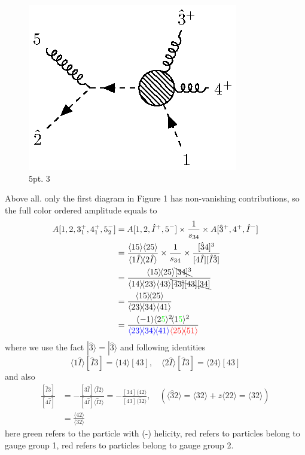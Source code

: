 \documentclass[12pt]{article}
\newcommand{\mdavg}[2]{\langle #1 \rangle\!\langle #2 \rangle}
\newcommand{\avg}[1]{\langle #1 \rangle}
\newcommand{\doubleavg}[2]{\left\langle #1 \right\rangle\!\left\langle #2 \right\rangle}
\newcommand{\inavg}[2]{\langle #1 \rangle\! [#2]}
\newcommand{\rinavg}[2]{[#1]\!\langle #2 \rangle}
\begin{document}
\begin{figure}[H]
    \centering
    \includegraphics{5pt3.eps}
    \caption{5pt. 3}
    \label{4}
\end{figure}
Above all. only the first diagram in Figure 1 has non-vanishing contributions, so the full color ordered amplitude equals to
\begin{align*}
    A[1,2,3_1^+,4_1^+,5_2^-]&=A[1,2,\hat{I}^+,5^-]\times\frac{1}{s_{34}}\times A[\hat{3}^+,4^+,\hat{I}^-]\\
    &=\frac{\doubleavg{15}{25}}{\mdavg{1\hat{I}}{2\hat{I}}}\times\frac{1}{s_{34}}\times\frac{[\hat{3}4]^3}{[4\hat{I}][\hat{I}\hat{3}]}\\
    &=\frac{\mdavg{15}{25}\bcancel{[34]^3}}{\mdavg{14}{23}\avg{43}\bcancel{[43][43][34]}}\\
    &=\frac{\mdavg{15}{25}}{\mdavg{23}{34}\avg{41}}\\
    &=\frac{(-1)\avg{2\textcolor{green}{5}}^2\!\avg{1\textcolor{green}{5}}^2}{\textcolor{blue}{\mdavg{23}{34}\!\avg{41}}\textcolor{red}{\mdavg{25}{51}}}
\end{align*}
where we use the fact $|\hat{3}\rangle=|\hat{3}\rangle$ and following identities
\begin{equation*}
    \inavg{1\hat{I}}{\hat{I}3}=\inavg{14}{43},\quad \inavg{2\hat{I}}{\hat{I}3}=\inavg{24}{43}
\end{equation*}
and also
\begin{align*}
    \frac{[\hat{I}3]}{[4\hat{I}]}&=-\frac{\rinavg{3\hat{I}}{\hat{I}2}}{\rinavg{4\hat{I}}{\hat{I}2}}=-\frac{\rinavg{34}{42}}{\rinavg{43}{\hat{3}2}},\quad(\avg{\hat{3}2}=\avg{32}+z\avg{22}=\avg{32})\\
    &=\frac{\avg{42}}{\avg{32}}
\end{align*}
here green refers to the particle with (-) helicity, red refers to particles belong to gauge group 1, red refers to particles belong to gauge group 2.
\end{document}

